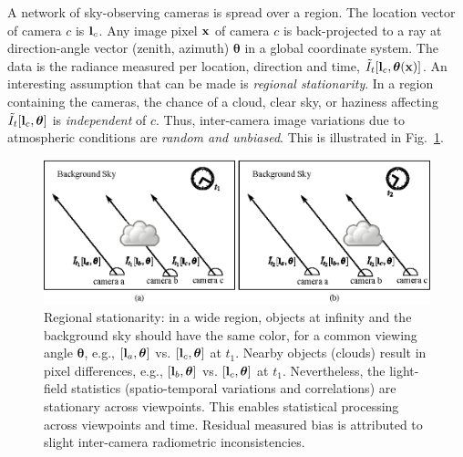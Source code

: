 \documentclass[runningheads]{llncs}
\begin{document}
A network of sky-observing cameras is spread over a region. The location vector of camera $c$ is ${\bf l}_c$. Any image pixel ${\bf x}$ of camera $c$ is back-projected to a ray at direction-angle vector (zenith, azimuth) ${\bm \theta}$ in a global coordinate system. The data is the radiance measured per location, direction and time, $\tilde I_t[{\bf l}_c,{\bm \theta}(\bf x)]$.
An interesting assumption that can be made is {\em regional stationarity}. In a region containing the cameras, the chance of a cloud, clear sky, or haziness affecting $\tilde I_t[{\bf l}_c,{\bm \theta}]$ is {\em independent} of $c$. Thus, inter-camera image variations due to atmospheric conditions are {\em random and unbiased}. This is illustrated in Fig.~\ref{fig:station}.
\begin{figure}[t!]
  \begin{center}
    \includegraphics[width=\linewidth]{figures/regional_stationarity.eps}
  \end{center}
  \vspace{-0.6cm}
  \caption{  %
    Regional stationarity: in a wide
    region, objects at infinity and the background
    sky should have the same color, for a common viewing angle ${\bm
      \theta}$, e.g.,
    $[{\bf l}_a,{\bm \theta}]$ vs. $[{\bf l}_c,{\bm \theta}]$ at $t_1$.
    Nearby objects (clouds) result in pixel differences, e.g.,
    $[{\bf l}_b,{\bm \theta}]$ vs. $[{\bf l}_c,{\bm \theta}]$ at $t_1$.
    Nevertheless, the light-field statistics (spatio-temporal variations and correlations) are stationary across viewpoints. This enables statistical processing  across viewpoints and time.  Residual measured bias is
    attributed to slight inter-camera radiometric inconsistencies.  }
  \label{fig:station}
\end{figure}
\end{document}
